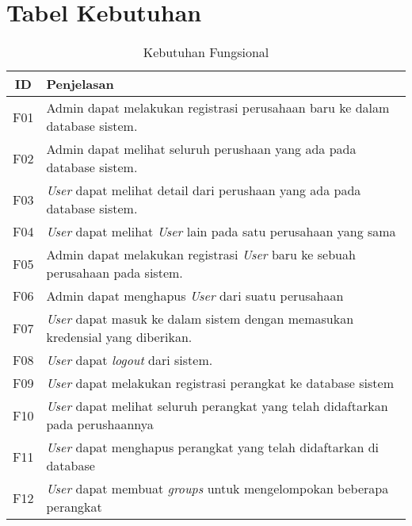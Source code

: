 \chapter{Tabel Kebutuhan}

\bgroup
\begin{table}[ht]
  \def\arraystretch{1.5}
  \caption{Kebutuhan Fungsional}
  \label{tab:kebutuhan-fungsional}
  \centering
  \begin{tabular}{|c|p{12cm}|}
    \hline
    ID  & Penjelasan                                                                                                      \\
    \hline
    F01 & Admin dapat melakukan registrasi perusahaan baru ke dalam database sistem.                                      \\
    \hline
    F02 & Admin dapat melihat seluruh perushaan yang ada pada database sistem.                                            \\
    \hline
    F03 & \textit{User} dapat melihat detail dari perushaan yang ada pada database sistem.                                \\
    \hline
    F04 & \textit{User} dapat melihat \textit{User} lain pada satu perusahaan yang sama                                   \\
    \hline
    F05 & Admin dapat melakukan registrasi \textit{User} baru ke sebuah perusahaan pada sistem.                           \\
    \hline
    F06 & Admin dapat menghapus \textit{User} dari suatu perusahaan                                                       \\
    \hline
    F07 & \textit{User} dapat masuk ke dalam sistem dengan memasukan kredensial yang diberikan.                           \\
    \hline
    F08 & \textit{User} dapat \textit{logout} dari sistem.                                                                \\
    \hline
    F09 & \textit{User} dapat melakukan registrasi perangkat ke database sistem                                           \\
    \hline
    F10 & \textit{User} dapat melihat seluruh perangkat yang telah didaftarkan pada perushaannya                          \\
    \hline
    F11 & \textit{User} dapat menghapus perangkat yang telah didaftarkan di database                                      \\
    \hline
    F12 & \textit{User} dapat membuat \textit{groups} untuk mengelompokan beberapa perangkat                              \\

\end{tabular}
\end{table}
